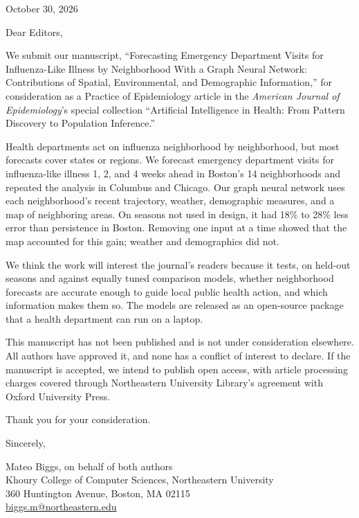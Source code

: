 \documentclass[11pt]{article}
\newcommand{\papertitle}{Forecasting Emergency Department Visits for Influenza-Like Illness by
Neighborhood With a Graph Neural Network: Contributions of Spatial,
Environmental, and Demographic Information}
\begin{document}
October 30, 2026

Dear Editors,

We submit our manuscript, ``\papertitle,'' for consideration as a Practice of
Epidemiology article in the \textit{American Journal of Epidemiology}'s special
collection ``Artificial Intelligence in Health: From Pattern Discovery to
Population Inference.''

Health departments act on influenza neighborhood by neighborhood, but most
forecasts cover states or regions. We forecast emergency department visits for
influenza-like illness 1, 2, and 4 weeks ahead in Boston's 14 neighborhoods and
repeated the analysis in Columbus and Chicago. Our graph neural network uses
each neighborhood's recent trajectory, weather, demographic measures, and a map
of neighboring areas. On seasons not used in design, it had 18\% to 28\% less
error than persistence in Boston. Removing one input at a time showed that the
map accounted for this gain; weather and demographics did not.

We think the work will interest the journal's readers because it tests, on
held-out seasons and against equally tuned comparison models, whether
neighborhood forecasts are accurate enough to guide local public health action,
and which information makes them so. The models are released as an open-source
package that a health department can run on a laptop.

This manuscript has not been published and is not under consideration
elsewhere. All authors have approved it, and none has a conflict of interest to
declare. If the manuscript is accepted, we intend to publish open access, with
article processing charges covered through Northeastern University Library's
agreement with Oxford University Press.

Thank you for your consideration.

Sincerely,

Mateo Biggs, on behalf of both authors\\
Khoury College of Computer Sciences, Northeastern University\\
360 Huntington Avenue, Boston, MA 02115\\
\href{mailto:biggs.m@northeastern.edu}{biggs.m@northeastern.edu}
\end{document}
